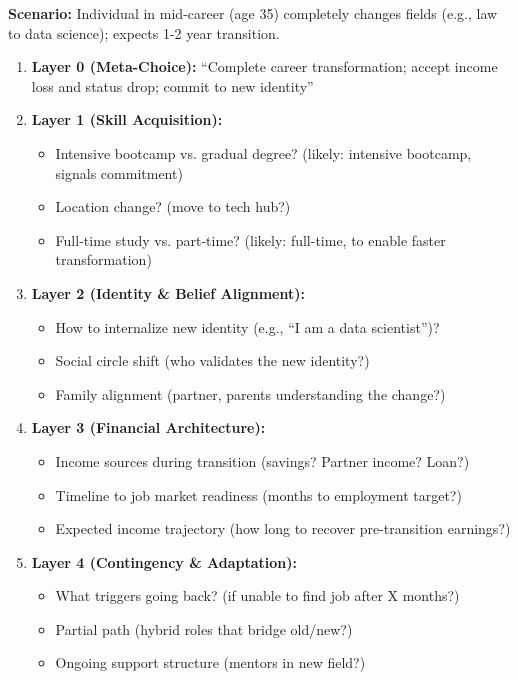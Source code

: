 \documentclass[11pt, a4paper]{article}
\begin{document}
\begin{tcolorbox}[colback=gray!5!white, colframe=gray!75!black, title=Example: Major Life Transition (e.g., Career Pivot to New Field)]

\textbf{Scenario:} Individual in mid-career (age 35) completely changes fields (e.g., law to data science); expects 1-2 year transition.

\begin{enumerate}
    \item \textbf{Layer 0 (Meta-Choice):} ``Complete career transformation; accept income loss and status drop; commit to new identity''

    \item \textbf{Layer 1 (Skill Acquisition):}
    \begin{itemize}[nosep]
        \item Intensive bootcamp vs. gradual degree? (likely: intensive bootcamp, signals commitment)
        \item Location change? (move to tech hub?)
        \item Full-time study vs. part-time? (likely: full-time, to enable faster transformation)
    \end{itemize}

    \item \textbf{Layer 2 (Identity \& Belief Alignment):}
    \begin{itemize}[nosep]
        \item How to internalize new identity (e.g., ``I am a data scientist'')?
        \item Social circle shift (who validates the new identity?)
        \item Family alignment (partner, parents understanding the change?)
    \end{itemize}

    \item \textbf{Layer 3 (Financial Architecture):}
    \begin{itemize}[nosep]
        \item Income sources during transition (savings? Partner income? Loan?)
        \item Timeline to job market readiness (months to employment target?)
        \item Expected income trajectory (how long to recover pre-transition earnings?)
    \end{itemize}

    \item \textbf{Layer 4 (Contingency \& Adaptation):}
    \begin{itemize}[nosep]
        \item What triggers going back? (if unable to find job after X months?)
        \item Partial path (hybrid roles that bridge old/new?)
        \item Ongoing support structure (mentors in new field?)
    \end{itemize}
\end{enumerate}


\end{tcolorbox}
\end{document}
